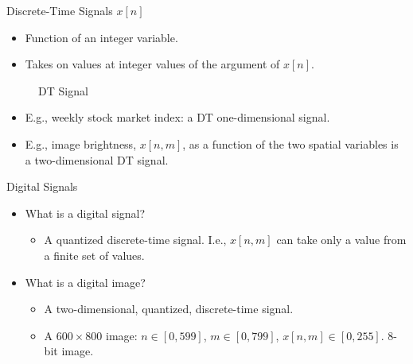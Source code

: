 %




\begin{frame}[plain]{Discrete-Time Signals $x[n]$}
    \begin{itemize}
        \item Function of an integer variable.
        \item Takes on values at integer values of the argument of $x[n]$.
    \end{itemize}
    \begin{figure}
      \centering
      
      \caption{DT Signal}\label{fi:dt_signal}
    \end{figure}
    \begin{itemize}
        \item E.g., weekly stock market index: a DT one-dimensional signal.
        \item E.g., image brightness,  $x[n,m]$,  as a function of the two spatial variables is a two-dimensional DT signal.
    \end{itemize}
\end{frame}

\begin{frame}{Digital Signals}
    \begin{itemize}
      \item What is a digital signal?
        \begin{itemize}
            \item A quantized discrete-time signal. I.e., $x[n,m]$ can take only a value from a finite set of values.
        \end{itemize}

      \item What is a digital image?
        \begin{itemize}
            \item A two-dimensional, quantized, discrete-time signal.
            \item A $600 \times 800$ image: $n \in [0, 599]$, $m \in [0, 799]$, $x[n,m] \in [0,255]$. 8-bit image.
        \end{itemize}
    \end{itemize}
\end{frame}

